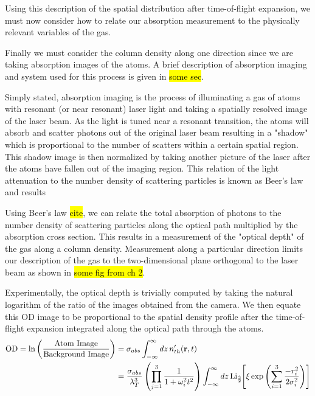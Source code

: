 Using this description of the spatial distribution after time-of-flight expansion, we must now consider how to relate our absorption measurement to the physically relevant variables of the gas.

Finally we must consider the column density along one direction since we are taking absorption images of the atoms. A brief description of absorption imaging and system used for this process is given in \hl{some sec}. 

Simply stated, absorption imaging is the process of illuminating a gas of atoms with resonant (or near resonant) laser light and taking a spatially resolved image of the laser beam. As the light is tuned near a resonant transition, the atoms will absorb and scatter photons out of the original laser beam resulting in a "shadow" which is proportional to the number of scatters within a certain spatial region. This shadow image is then normalized by taking another picture of the laser after the atoms have fallen out of the imaging region. This relation of the light attenuation to the number density of scattering particles is known as Beer's law and results 

Using Beer's law \hl{cite}, we can relate the total absorption of photons to the number density of scattering particles along the optical path multiplied by the absorption cross section. This results in a measurement of the "optical depth" of the gas along a column density. Measurement along a particular direction limits our description of the gas to the two-dimensional plane orthogonal to the laser beam as shown in \hl{some fig from ch 2}.

Experimentally, the optical depth is trivially computed by taking the natural logarithm of the ratio of the images obtained from the camera. We then equate this OD image to be proportional to the spatial density profile after the time-of-flight expansion integrated along the optical path through the atoms.
\begin{equation}
\begin{split}
\text{OD} = \text{ln} \left( \frac{\text{Atom Image}}{\text{Background Image}} \right) &= \sigma_{abs} \int_{-\infty}^{\infty} dz \, n_{th}'(\mathbf{r},t) \\ 
&= \frac{\sigma_{abs}}{\lambda_T^3} \left( \prod_{j=1}^3 \frac{1}{1+\omega_i^2t^2}\right) \int_{-\infty}^{\infty} dz\,\text{Li}_{\scriptscriptstyle\frac{3}{2}\!}\!\left[ \xi \,\text{exp}\left( {\sum_{i=1}^3 \frac{-r_i^2}{2\sigma_i^2}} \right) \right]
\end{split}
\end{equation}

